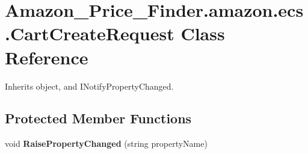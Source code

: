 \hypertarget{class_amazon___price___finder_1_1amazon_1_1ecs_1_1_cart_create_request}{\section{Amazon\-\_\-\-Price\-\_\-\-Finder.\-amazon.\-ecs.\-Cart\-Create\-Request Class Reference}
\label{class_amazon___price___finder_1_1amazon_1_1ecs_1_1_cart_create_request}
}


 




Inherits object, and I\-Notify\-Property\-Changed.

\subsection*{Protected Member Functions}
\begin{DoxyCompactItemize}
\item 
\hypertarget{class_amazon___price___finder_1_1amazon_1_1ecs_1_1_cart_create_request_a3eb05325ed0027329eb83edf46c0daa1}{void {\bfseries Raise\-Property\-Changed} (string property\-Name)}\label{class_amazon___price___finder_1_1amazon_1_1ecs_1_1_cart_create_request_a3eb05325ed0027329eb83edf46c0daa1}

\end{DoxyCompactItemize}

